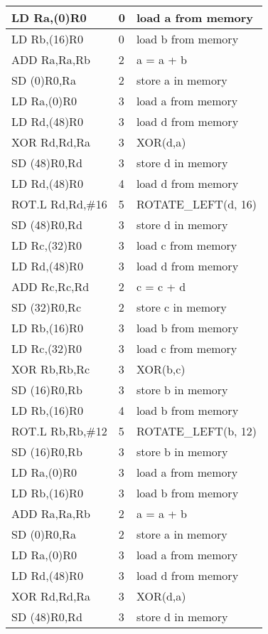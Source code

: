 \begin{enumerate}[wide, label=(B\arabic*)]
\begin{longtable}{|l|l|l|}
LD Ra,(0)R0	& 0	& load a from memory  \\ \hline
LD Rb,(16)R0	& 0	& load b from memory  \\ \hline
ADD Ra,Ra,Rb	& 2	& a = a + b           \\ \hline
SD (0)R0,Ra	& 2	& store a in memory   \\ \hline
LD Ra,(0)R0	& 3	& load a from memory  \\ \hline
LD Rd,(48)R0	& 3	& load d from memory  \\ \hline
XOR Rd,Rd,Ra	& 3	& XOR(d,a)            \\ \hline
SD (48)R0,Rd	& 3	& store d in memory   \\ \hline
LD Rd,(48)R0	& 4	& load d from memory  \\ \hline
ROT.L Rd,Rd,\#16	& 5	& ROTATE\_LEFT(d, 16) \\ \hline
SD (48)R0,Rd	& 3	& store d in memory   \\ \hline
LD Rc,(32)R0	& 3	& load c from memory  \\ \hline
LD Rd,(48)R0	& 3	& load d from memory  \\ \hline
ADD Rc,Rc,Rd	& 2	& c = c + d           \\ \hline
SD (32)R0,Rc	& 2	& store c in memory   \\ \hline
LD Rb,(16)R0	& 3	& load b from memory  \\ \hline
LD Rc,(32)R0	& 3	& load c from memory  \\ \hline
XOR Rb,Rb,Rc	& 3	& XOR(b,c)            \\ \hline
SD (16)R0,Rb	& 3	& store b in memory   \\ \hline
LD Rb,(16)R0	& 4	& load b from memory  \\ \hline
ROT.L Rb,Rb,\#12	& 5	& ROTATE\_LEFT(b, 12) \\ \hline
SD (16)R0,Rb	& 3	& store b in memory   \\ \hline
LD Ra,(0)R0	& 3	& load a from memory  \\ \hline
LD Rb,(16)R0	& 3	& load b from memory  \\ \hline
ADD Ra,Ra,Rb	& 2	& a = a + b           \\ \hline
SD (0)R0,Ra	& 2	& store a in memory   \\ \hline
LD Ra,(0)R0	& 3	& load a from memory  \\ \hline
LD Rd,(48)R0	& 3	& load d from memory  \\ \hline
XOR Rd,Rd,Ra	& 3	& XOR(d,a)            \\ \hline
SD (48)R0,Rd	& 3	& store d in memory   \\ \hline

\end{longtable}
\end{enumerate}
